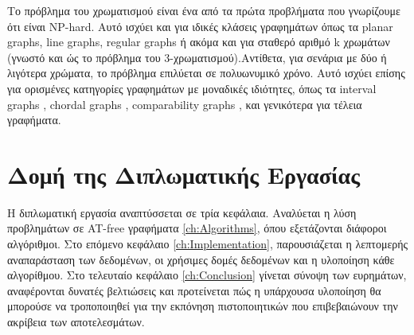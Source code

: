 Το πρόβλημα του χρωματισμού είναι ένα από τα πρώτα προβλήματα που γνωρίζουμε ότι είναι NP-hard\cite{garey-johnson-np-completeness}. Αυτό ισχύει και για ιδικές κλάσεις γραφημάτων όπως τα planar graphs\cite{garey-johnson-stockmeyer-simplified-np}, line graphs\cite{holyer-np-completeness-edge-coloring}, regular graphs\cite{dailey-uniqueness-colorability-np-complete} ή ακόμα και για σταθερό αριθμό k χρωμάτων (γνωστό και ώς το πρόβλημα του 3-χρωματισμού)\cite{garey-johnson-stockmeyer-simplified-np}.Αντίθετα, για σενάρια με δύο ή λιγότερα χρώματα, το πρόβλημα επιλύεται σε πολυωνυμικό χρόνο. Αυτό ισχύει επίσης για ορισμένες κατηγορίες γραφημάτων με μοναδικές ιδιότητες, όπως τα interval graphs
\cite{golumbic-algorithmic-graph-theory-perfect-graphs}, chordal graphs \cite{golumbic-algorithmic-graph-theory-perfect-graphs}, comparability graphs \cite{golumbic-algorithmic-graph-theory-perfect-graphs}, και γενικότερα για τέλεια
γραφήματα\cite{grotschel-lovasz-schrijver-ellipsoid-method}. 



\section{Δομή της Διπλωματικής Εργασίας}
\label{sec:Structure}
Η διπλωματική εργασία αναπτύσσεται σε τρία κεφάλαια. Αναλύεται η λύση προβλημάτων σε AT-free γραφήματα  \ref{ch:Algorithms}, όπου εξετάζονται διάφοροι αλγόριθμοι. Στο επόμενο κεφάλαιο \ref{ch:Implementation}, παρουσιάζεται η λεπτομερής αναπαράσταση των δεδομένων, οι χρήσιμες δομές δεδομένων και η υλοποίηση κάθε αλγορίθμου. Στο τελευταίο κεφάλαιο \ref{ch:Conclusion} γίνεται σύνοψη των ευρημάτων, αναφέρονται δυνατές βελτιώσεις και προτείνεται πώς η υπάρχουσα υλοποίηση θα μπορούσε να τροποποιηθεί για την εκπόνηση πιστοποιητικών που επιβεβαιώνουν την ακρίβεια των αποτελεσμάτων.